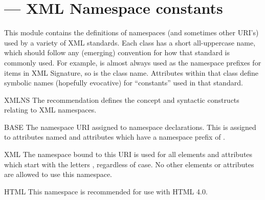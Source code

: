\documentclass{howto}
\begin{document}


\section{ ---
         XML Namespace constants}


This module contains the definitions of namespaces (and sometimes
other URI's) used by a variety of XML standards.  Each class has a
short all-uppercase name, which should follow any (emerging)
convention for how that standard is commonly used.  For example,
 is almost always used as the namespace prefixes for items in
XML Signature, so  is the class name.  Attributes within that
class define symbolic names (hopefully evocative) for ``constants''
used in that standard.

\begin{classdesc*}{XMLNS}
  The  recommendation defines the concept and syntactic constructs
  relating to XML namespaces.

  \begin{memberdesc}{BASE}
    The namespace URI assigned to namespace declarations.  This is
    assigned to attributes named  and attributes which
    have a namespace prefix of .
  \end{memberdesc}

  \begin{memberdesc}{XML}
    The namespace bound to this URI is used for all elements and
    attributes which start with the letters , regardless of
    case.  No other elements or attributes are allowed to use this
    namespace.
  \end{memberdesc}

  \begin{memberdesc}{HTML}
    This namespace is recommended for use with HTML 4.0.
  \end{memberdesc}
\end{classdesc*}
\end{document}
